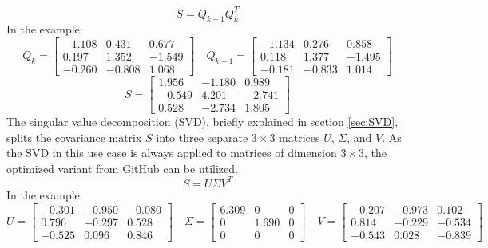 \begin{equation*}
    S= Q_{k-1}Q_{k}^{T}
\end{equation*}
In the example:
\begin{equation*}
    Q_{k}=
    \begin{bmatrix}
        -1.108 & 0.431  & 0.677  \\
        0.197  & 1.352  & -1.549 \\
        -0.260 & -0.808 & 1.068
    \end{bmatrix} \quad
    Q_{k-1}=
    \begin{bmatrix}
        -1.134 & 0.276  & 0.858  \\
        0.118  & 1.377  & -1.495 \\
        -0.181 & -0.833 & 1.014
    \end{bmatrix}
\end{equation*}
\begin{equation*}
    S= 
    \begin{bmatrix}
        1.956 & -1.180 & 0.989 \\
        -0.549 & 4.201 & -2.741 \\
        0.528 & -2.734 & 1.805
    \end{bmatrix}
\end{equation*}
The singular value decomposition (SVD), briefly explained in section \ref{sec:SVD}, splits the covariance matrix $S$ into three separate $3\times3$ matrices $U$, $\Sigma$, and $V$. As the SVD in this use case is always applied to matrices of dimension $3\times3$, the optimized variant\cite{Gao:2018:GPU_MPM} from GitHub\cite{Github_SVD_CUDA} can be utilized.
\begin{equation*}
    S= U\Sigma V^{T}
\end{equation*}
In the example:
\begin{equation*}
    U=
    \begin{bmatrix}
        -0.301 & -0.950 & -0.080 \\
        0.796 & -0.297 & 0.528 \\
        -0.525 & 0.096 & 0.846
    \end{bmatrix} \quad
    \Sigma=
    \begin{bmatrix}
        6.309 & 0 & 0 \\
        0 & 1.690 & 0 \\
        0 & 0 & 0
    \end{bmatrix} \quad
    V=
    \begin{bmatrix}
        -0.207 & -0.973 & 0.102 \\
        0.814 & -0.229 & -0.534 \\
        -0.543 & 0.028 & -0.839
    \end{bmatrix}
\end{equation*}
